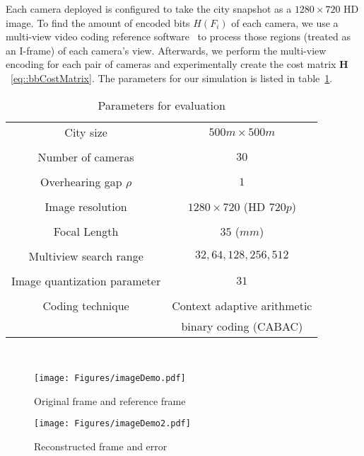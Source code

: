 Each camera deployed is configured to take the city snapshot as a $1280 \times 720$ HD image.
To find the amount of encoded bits $H(F_i)$ of each camera, we use a multi-view video coding reference software~\cite{JMVC} to process those regions (treated as an I-frame) of each camera's view.
Afterwards, we perform the multi-view encoding for each pair of cameras and experimentally create the cost matrix $\mathbf{H}$~\eqref{eq::bbCostMatrix}.
The parameters for our simulation is listed in table~\ref{tab::evaParameters}.
%
\begin{table}[htb]
\footnotesize
\centering
\begin{tabular}{c||c}
  \hline
  City size & $500m \times 500m$ \\ \\
  Number of cameras & $30$ \\ \\
  Overhearing gap $\rho$ & $1$ \\ \\
  Image resolution & $1280 \times 720$ (HD $720p$) \\ \\
  Focal Length & $35$ ($mm$) \\ \\
  Multiview search range & $32,64,128,256,512$ \\ \\
  Image quantization parameter & $31$ \\ \\
  Coding technique & Context adaptive arithmetic \\
                                  & binary coding (CABAC) \\
  \hline
\end{tabular}
\\
\caption{\label{tab::evaParameters}Parameters for evaluation}
\end{table}
%
\begin{figure}
\begin{center}
\texttt{[image: Figures/imageDemo.pdf]}
\caption{\label{fig::imageDemo}Original frame and reference frame}
\end{center}
\end{figure}
%
\begin{figure}
\begin{center}
\texttt{[image: Figures/imageDemo2.pdf]}
\caption{\label{fig::imageDemo2}Reconstructed frame and error}
\end{center}
\end{figure}
%

